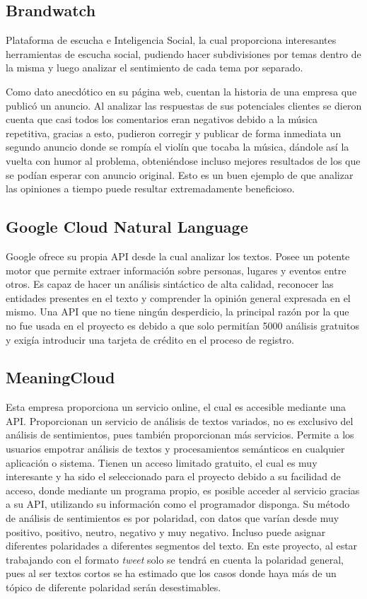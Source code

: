 \subsection{Brandwatch\cite{Brandwatch}}
Plataforma de escucha e Inteligencia Social, la cual proporciona interesantes herramientas de escucha social, pudiendo hacer subdivisiones por temas dentro de la misma y luego analizar el sentimiento de cada tema por separado. 

Como dato anecdótico en su página web, cuentan la historia de una empresa que publicó un anuncio. Al analizar las respuestas de sus potenciales clientes se dieron cuenta que casi todos los comentarios eran negativos debido a la música repetitiva, gracias a esto, pudieron corregir y publicar de forma inmediata un segundo anuncio donde se rompía el violín que tocaba la música, dándole así la vuelta con humor al problema, obteniéndose incluso mejores resultados de los que se podían esperar con anuncio original. Esto es un buen ejemplo de que analizar las opiniones a tiempo puede resultar extremadamente beneficioso.

\subsection{Google Cloud Natural Language\cite{GoogleCloudNaturalLanguage}}

Google ofrece su propia API desde la cual analizar los textos. Posee un potente motor que permite extraer información sobre personas, lugares y eventos entre otros. Es capaz de hacer un análisis sintáctico de alta calidad, reconocer las entidades presentes en el texto y comprender la opinión general expresada en el mismo. Una API que no tiene ningún desperdicio, la principal razón por la que no fue usada en el proyecto es debido a que solo permitían 5000 análisis gratuitos y exigía introducir una tarjeta de crédito en el proceso de registro. 

\subsection{MeaningCloud\cite{MeaningCloud}}

Esta empresa proporciona un servicio online, el cual es accesible mediante una API. Proporcionan un servicio de análisis de textos variados, no es exclusivo del análisis de sentimientos, pues también proporcionan más servicios. Permite a los usuarios empotrar análisis de textos y procesamientos semánticos en cualquier aplicación o sistema. Tienen un acceso limitado gratuito, el cual es muy interesante y ha sido el seleccionado para el proyecto debido a su facilidad de acceso, donde mediante un programa propio, es posible acceder al servicio gracias a su API, utilizando su información como el programador disponga. Su método de análisis de sentimientos es por polaridad, con datos que varían desde muy positivo, positivo, neutro, negativo y muy negativo. Incluso puede asignar diferentes polaridades a diferentes segmentos del texto. En este proyecto, al estar trabajando con el formato \textit{tweet} solo se tendrá en cuenta la polaridad general, pues al ser textos cortos se ha estimado que los casos donde haya más de un tópico de diferente polaridad serán desestimables. 

